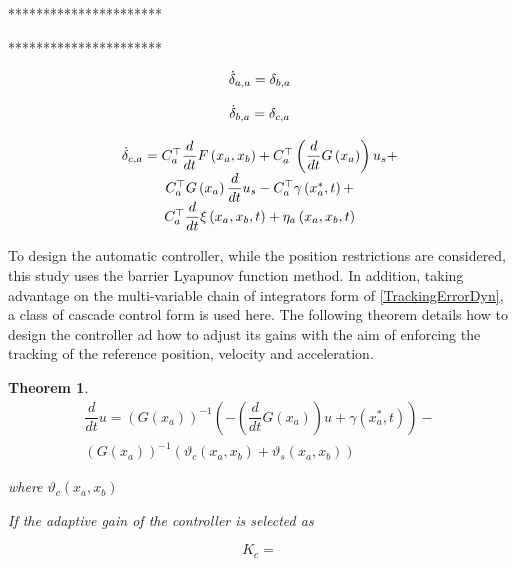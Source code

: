 \documentclass[journal,twocolumn]{IEEEtran}
\newtheorem{theorem}{Theorem}
\begin{document}
**********************

**********************

\begin{equation}
\begin{array}{c}
\dot{\delta}_{a,a}={\delta}_{b,a} \\ 
\\
\dot{\delta}_{b,a}={\delta}_{c,a} \\ 
\\
\dot{\delta}_{c,a}= C^{\top}_{a} \dfrac{d}{dt} F \left( x_{a},x_{b}\right) +C^{\top}_{a} \left( \dfrac{d}{%
dt}G\left( x_{a}\right) \right) u_{s}+ \\
C^{\top}_{a} G\left( x_{a}\right) \dfrac{d}{dt}%
u_{s} - C^{\top}_{a} \gamma \left( {x}^{*}_{a},t\right) + \\
C^{\top}_{a} \dfrac{d}{dt}\xi \left( x_{a},x_{b},t\right) + \eta_{a}\left( x_{a},x_{b},t\right)  
\end{array}%
\label{TrackingErrorDyn}
\end{equation}

To design the automatic controller, while the position restrictions are considered, this study uses the barrier Lyapunov function method. In addition, taking advantage on the multi-variable chain of integrators form of \eqref{TrackingErrorDyn}, a class of cascade control form is used here. The following theorem details how to design the controller ad how to adjust its gains with the aim of enforcing the tracking of the reference position, velocity and acceleration.  



\begin{theorem}
    
    
    \begin{equation}
        \begin{array}{c}
            \dfrac{d}{dt} u = \left( G\left( x_{a}\right) \right)^{-1} \left( - \left( \dfrac{d}{dt}G\left( x_{a}\right) \right) u + \gamma \left( {x}^{*}_{a},t\right) \right) -  \\
            \left( G\left( x_{a}\right) \right)^{-1} \left( \vartheta_{c} \left( x_{a},x_{b}\right) + \vartheta_{s} \left( x_{a},x_{b}\right)  \right) 
        \end{array}
    \end{equation}

\noindent where $\vartheta_{c} \left( x_{a},x_{b}\right) $    
    
    If the adaptive gain of the controller is selected as 
    
    \begin{equation}
        K_{c} = 
    \end{equation}
    
\end{theorem}
\end{document}

